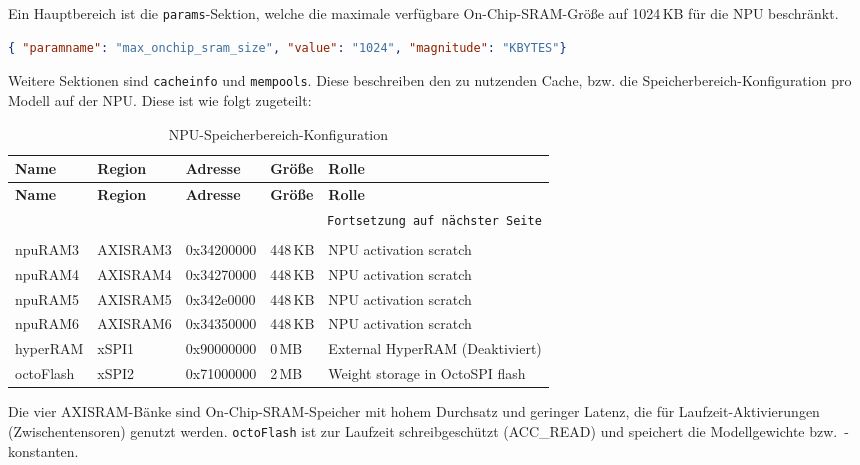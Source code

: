 Ein Hauptbereich ist die \texttt{params}-Sektion, welche die maximale verfügbare On-Chip-SRAM-Größe auf 1024\,KB für die NPU beschränkt.

\begin{lstlisting}[language=json, caption={Globale Speichereinschränkung in .mpool}, label={lst:mpool-params}]
{ "paramname": "max_onchip_sram_size", "value": "1024", "magnitude": "KBYTES"}
\end{lstlisting}

Weitere Sektionen sind \texttt{cacheinfo} und \texttt{mempools}.  Diese beschreiben den zu nutzenden Cache, bzw. die Speicherbereich-Konfiguration pro Modell auf der NPU. Diese ist wie folgt zugeteilt:

\begin{longtable}{|l|l|l|l|p{}|}
    \hline
    \textbf{Name} & \textbf{Region} & \textbf{Adresse} & \textbf{Größe} & \textbf{Rolle} \\
    \hline
    \endfirsthead
    \hline
    \textbf{Name} & \textbf{Region} & \textbf{Adresse} & \textbf{Größe} & \textbf{Rolle} \\
    \hline
    \endhead
    \hline
    \multicolumn{5}{r}{\texttt{Fortsetzung auf nächster Seite}} \\
    \endfoot
    \caption{NPU-Speicherbereich-Konfiguration}
    \label{tab:npu-mempools} \\
    \endlastfoot
    npuRAM3 & AXISRAM3 & 0x34200000 & 448\,KB & NPU activation scratch \\
    \hline
    npuRAM4 & AXISRAM4 & 0x34270000 & 448\,KB & NPU activation scratch \\
    \hline
    npuRAM5 & AXISRAM5 & 0x342e0000 & 448\,KB & NPU activation scratch \\
    \hline
    npuRAM6 & AXISRAM6 & 0x34350000 & 448\,KB & NPU activation scratch \\
    \hline
    hyperRAM & xSPI1 & 0x90000000 & 0\,MB & External HyperRAM (Deaktiviert) \\
    \hline
    octoFlash & xSPI2 & 0x71000000 & 2\,MB & Weight storage in OctoSPI flash \\
    \hline
\end{longtable}

Die vier AXISRAM-Bänke sind On-Chip-SRAM-Speicher mit hohem Durchsatz und geringer Latenz, die für Laufzeit-Aktivierungen (Zwischentensoren) genutzt werden. \texttt{octoFlash} ist zur Laufzeit schreibgeschützt (ACC\_READ) und speichert die Modellgewichte bzw.\ -konstanten.

